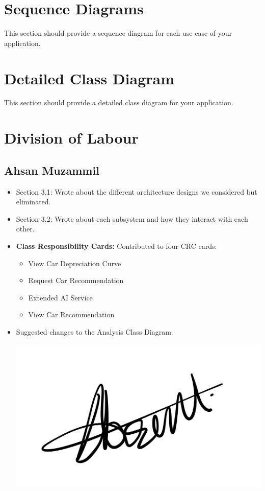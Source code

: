 \documentclass[]{article}
\begin{document}
\section{Sequence Diagrams}
\label{sec:sequence_diagrams}
This section should provide a sequence diagram for each use case of your application.

\section{Detailed Class Diagram}
\label{sec:detailed_class_diagram}
This section should provide a detailed class diagram for your application.

\appendix
\section{Division of Labour}
\label{sec:division_of_labour}
\subsection{Ahsan Muzammil}
\begin{itemize}
  \item Section 3.1: Wrote about the different architecture designs we considered but eliminated.
  \item Section 3.2: Wrote about each subsystem and how they interact with each other.
  \item \textbf{Class Responsibility Cards:} Contributed to four CRC cards:
        \begin{itemize}
          \item View Car Depreciation Curve
          \item Request Car Recommendation
          \item Extended AI Service
          \item View Car Recommendation
        \end{itemize}
  \item Suggested changes to the Analysis Class Diagram.
        \begin{center}
          \includegraphics[scale=0.1]{ahsan.jpeg}
        \end{center}
\end{itemize}
\end{document}
